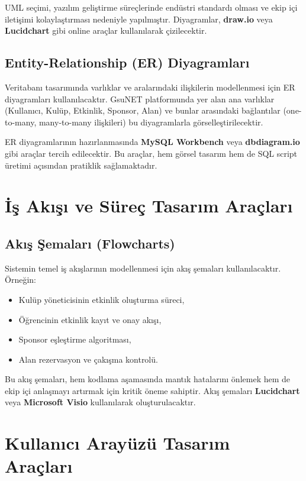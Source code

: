 \documentclass[a4paper,12pt]{report}
\begin{document}
UML seçimi, yazılım geliştirme süreçlerinde endüstri standardı olması ve ekip içi iletişimi kolaylaştırması nedeniyle yapılmıştır. Diyagramlar, \textbf{draw.io} veya \textbf{Lucidchart} gibi online araçlar kullanılarak çizilecektir.

\subsection{Entity-Relationship (ER) Diyagramları}

Veritabanı tasarımında varlıklar ve aralarındaki ilişkilerin modellenmesi için ER diyagramları kullanılacaktır. GsuNET platformunda yer alan ana varlıklar (Kullanıcı, Kulüp, Etkinlik, Sponsor, Alan) ve bunlar arasındaki bağlantılar (one-to-many, many-to-many ilişkileri) bu diyagramlarla görselleştirilecektir.

ER diyagramlarının hazırlanmasında \textbf{MySQL Workbench} veya \textbf{dbdiagram.io} gibi araçlar tercih edilecektir. Bu araçlar, hem görsel tasarım hem de SQL script üretimi açısından pratiklik sağlamaktadır.

\section{İş Akışı ve Süreç Tasarım Araçları}

\subsection{Akış Şemaları (Flowcharts)}

Sistemin temel iş akışlarının modellenmesi için akış şemaları kullanılacaktır. Örneğin:

\begin{itemize}
    \item Kulüp yöneticisinin etkinlik oluşturma süreci,
    \item Öğrencinin etkinlik kayıt ve onay akışı,
    \item Sponsor eşleştirme algoritması,
    \item Alan rezervasyon ve çakışma kontrolü.
\end{itemize}

Bu akış şemaları, hem kodlama aşamasında mantık hatalarını önlemek hem de ekip içi anlaşmayı artırmak için kritik öneme sahiptir. Akış şemaları \textbf{Lucidchart} veya \textbf{Microsoft Visio} kullanılarak oluşturulacaktır.

\section{Kullanıcı Arayüzü Tasarım Araçları}
\end{document}
